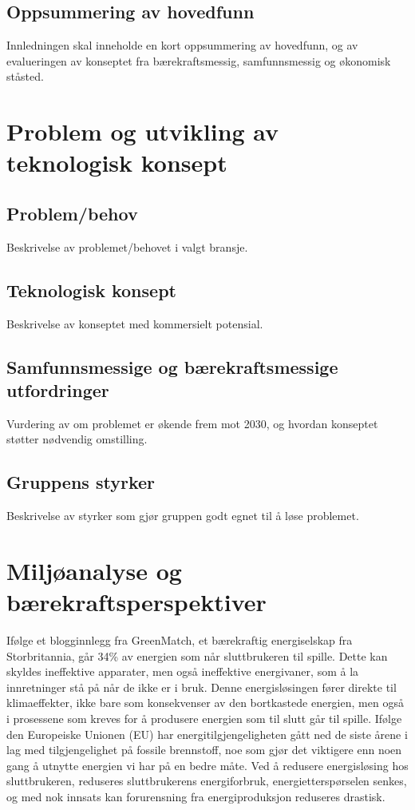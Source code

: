 \documentclass{article}
\begin{document}
\subsection*{Oppsummering av hovedfunn}
Innledningen skal inneholde en kort oppsummering av hovedfunn, og av evalueringen av konseptet fra bærekraftsmessig, samfunnsmessig og økonomisk ståsted.

\section{Problem og utvikling av teknologisk konsept}
\subsection*{Problem/behov}
Beskrivelse av problemet/behovet i valgt bransje.

\subsection*{Teknologisk konsept}
Beskrivelse av konseptet med kommersielt potensial.

\subsection*{Samfunnsmessige og bærekraftsmessige utfordringer}
Vurdering av om problemet er økende frem mot 2030, og hvordan konseptet støtter nødvendig omstilling.



\subsection*{Gruppens styrker}
Beskrivelse av styrker som gjør gruppen godt egnet til å løse problemet.




\section{Miljøanalyse og bærekraftsperspektiver}
Ifølge et blogginnlegg fra GreenMatch, et bærekraftig energiselskap fra Storbritannia, går 34\% av energien som når sluttbrukeren til spille. Dette kan skyldes ineffektive apparater, men også ineffektive energivaner, som å la innretninger stå på når de ikke er i bruk. Denne energisløsingen fører direkte til klimaeffekter, ikke bare som konsekvenser av den bortkastede energien, men også i prosessene som kreves for å produsere energien som til slutt går til spille. Ifølge den Europeiske Unionen (EU) har energitilgjengeligheten gått ned de siste årene i lag med tilgjengelighet på fossile brennstoff, noe som gjør det viktigere enn noen gang å utnytte energien vi har på en bedre måte. Ved å redusere energisløsing hos sluttbrukeren, reduseres sluttbrukerens energiforbruk, energietterspørselen senkes, og med nok innsats kan forurensning fra energiproduksjon reduseres drastisk.
\end{document}
